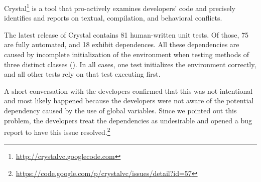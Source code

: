 Crystal\footnote{\url{http://crystalvc.googlecode.com}} is a tool that
pro-actively examines developers' code and precisely identifies and reports on textual, compilation, and behavioral conflicts.

The latest release of Crystal contains 81 human-written unit tests. 
Of those, 75 are fully automated, and 18 exhibit
dependences.
All these dependencies are caused by incomplete initialization of the
environment when testing methods of three distinct classes
().
In all cases, one test initializes the environment correctly, and all
other tests rely on that test executing first. 

A short conversation with the developers confirmed that this was not
intentional and most likely happened because the developers were not
aware of the potential dependency caused by the use of global
variables. Since we pointed out this problem, the developers treat the
dependencies as undesirable and opened a bug report to have this issue
resolved.\footnote{\url{https://code.google.com/p/crystalvc/issues/detail?id=57}}

%
%
%
%

